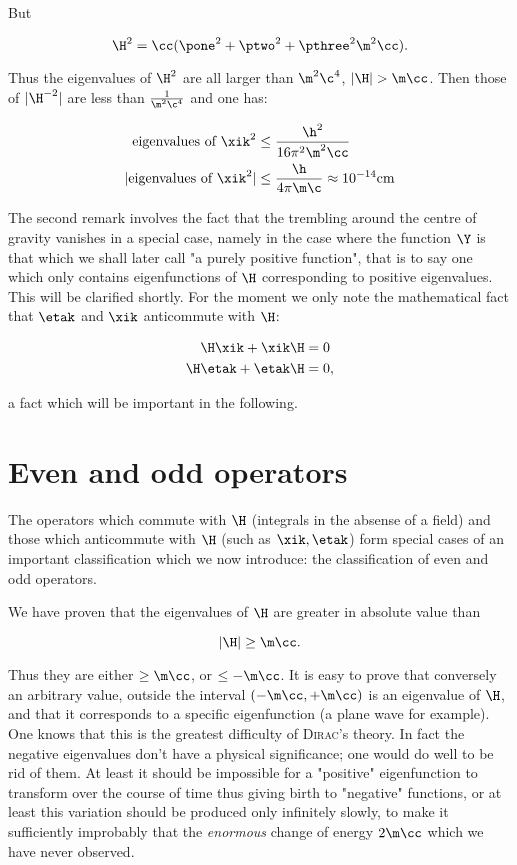 \documentclass{article}
\newcommand{\uequ}[1]{
\begin{equation*}
#1
\end{equation*}
}
\newcommand{\inv}[1]{\frac{1}{#1}}
\renewcommand{\it}[1]{\textit{#1}}
\renewcommand{\sc}[1]{\textsc{#1}}
\begin{document}
But
\uequ{
\H^2 = \cc(\pone^2 + \ptwo^2 + \pthree^2 \m^2\cc).
}
Thus the eigenvalues of $\H^2$ are all larger than $\m^2\c^4$, $|\H| > \m\cc$. Then those of $|\H^{-2}|$ are less than $\inv{\m^2\c^4}$ and one has:

\uequ{
\begin{split}
\text{eigenvalues of $\xik^2$} &\leq \frac{\h^2}{16\pi^2\m^2\cc} \\
|\text{eigenvalues of $\xik^2$}| &\leq \frac{\h}{4\pi\m\c} \approx 10^{-14} \text{cm}
\end{split}
}

The second remark involves the fact that the trembling around the centre of gravity vanishes in a special case, namely in the case where the function $\Y$ is that which we shall later call "a purely positive function", that is to say one which only contains eigenfunctions of $\H$ corresponding to positive eigenvalues. This will be clarified shortly. For the moment we only note the mathematical fact that $\etak$ and $\xik$ anticommute with $\H$:
\uequ{
\begin{split}
\H\xik + \xik\H &= 0 \\
\H\etak + \etak\H &= 0,
\end{split}
}
a fact which will be important in the following.

\section{Even and odd operators}

The operators which commute with $\H$ (integrals in the absense of a field) and those which anticommute with $\H$ (such as $\xik, \etak$) form special cases of an important classification which we now introduce: the classification of even and odd operators.

We have proven that the eigenvalues of $\H$ are greater in absolute value than 
\uequ{
|\H| \geq \m\cc.
}
Thus they are either $\geq \m\cc$, or $\leq -\m\cc$. It is easy to prove that conversely an arbitrary value, outside the interval $(-\m\cc, +\m\cc)$ is an eigenvalue of $\H$, and that it corresponds to a specific eigenfunction (a plane wave for example). One knows that this is the greatest difficulty of \sc{Dirac}'s theory. In fact the negative eigenvalues don't have a physical significance; one would do well to be rid of them. At least it should be impossible for a "positive" eigenfunction to transform over the course of time thus giving birth to "negative" functions, or at least this variation should be produced only infinitely slowly, to make it sufficiently improbably that the \it{enormous} change of energy $2\m\cc$ which we have never observed.
\end{document}

